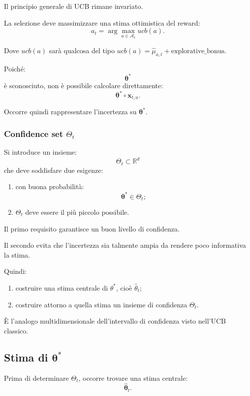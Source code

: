Il principio generale di UCB rimane invariato.

La selezione deve massimizzare una stima ottimistica del reward:
\[
a_t
=
\arg\max_{a\in\mathcal{A}_t}
ucb(a).
\]

\begin{warning}{}
    Dove $ucb(a)$ sarà qualcosa del tipo $ucb(a) = \widehat{\mu}_{a,t} + \text{explorative\_bonus}$.
\end{warning}

Poiché:
\[
\boldsymbol{\theta}^{*}
\]
è sconosciuto, non è possibile calcolare direttamente:
\[
\boldsymbol{\theta}^{*}
\circ
\mathbf{x}_{t,a}.
\]

Occorre quindi rappresentare l'incertezza su $\boldsymbol{\theta}^{*}$.

\subsubsection{Confidence set $\Theta_t$}

Si introduce un insieme:
\[
\Theta_t\subset\mathbb{R}^{d}
\]
che deve soddisfare due esigenze:
\begin{enumerate}
    \item con buona probabilità:
    \[
    \boldsymbol{\theta}^{*}\in\Theta_t;
    \]
    \item $\Theta_t$ deve essere il più piccolo possibile.
\end{enumerate}

Il primo requisito garantisce un buon livello di confidenza.

Il secondo evita che l'incertezza sia talmente ampia da rendere poco informativa la stima.

Quindi:
\begin{enumerate}
    \item costruire una stima centrale di \(\theta^*\), cioè \(\widehat{\theta}_t\);
    \item costruire attorno a quella stima un insieme di confidenza \(\Theta_t\).
\end{enumerate}
È l'analogo multidimensionale dell'intervallo di confidenza visto nell'UCB classico.

\subsection{Stima di $\boldsymbol{\theta}^{*}$}

Prima di determinare $\Theta_t$, occorre trovare una stima centrale:
\[
\widehat{\boldsymbol{\theta}}_t.
\]

